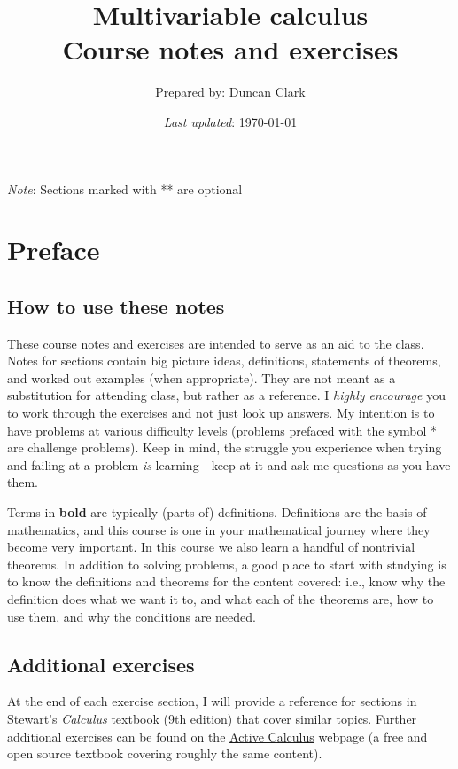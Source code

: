 \documentclass[12pt]{article}
\numberwithin{equation}{subsection}
\numberwithin{figure}{subsection}
\theoremstyle{note}
\begin{document}
\title{ \textbf{Multivariable calculus \\ Course notes and exercises
}}
\author{\small Prepared by: Duncan Clark}
\date{\small%
\textit{Last updated}: \today}
\maketitle 

{\small
\tableofcontents 

\textit{Note}: Sections marked with ** are optional
\newpage

\section{Preface}


\subsection{How to use these notes} These course notes and exercises are intended to serve as an aid to the class. Notes for sections contain big picture ideas, definitions, statements of theorems, and worked out examples (when appropriate). They are not meant as a substitution for attending class, but rather as a reference. I \textit{highly encourage} you to work through the exercises and not just look up answers. My intention is to have problems at various difficulty levels (problems prefaced with the symbol * are challenge problems). Keep in mind, the struggle you experience when trying and failing at a problem \textit{is} learning---keep at it and ask me questions as you have them. 


Terms in \textbf{bold} are typically (parts of) definitions. Definitions are the basis of mathematics, and this course is one in your mathematical journey where they become very important. In this course we also learn a handful of nontrivial theorems. In addition to solving problems, a good place to start with studying is to know the definitions and theorems for the content covered: i.e., know why the definition does what we want it to, and  what each of the theorems are, how to use them, and why the conditions are needed.


\subsection{Additional exercises}

At the end of each exercise section, I will provide a reference for sections in Stewart's \textit{Calculus} textbook (9th edition) that cover similar topics. Further additional exercises can be found on the \href{https://activecalculus.org/multi/frontmatter.html}{Active Calculus} webpage (a free and open source textbook covering roughly the same content).



}
\end{document}
